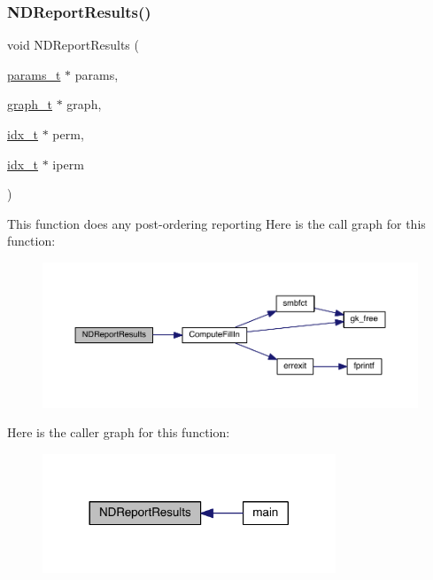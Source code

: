 \subsubsection{\texorpdfstring{N\+D\+Report\+Results()}{NDReportResults()}}
{\footnotesize\ttfamily void N\+D\+Report\+Results (\begin{DoxyParamCaption}\item[{\hyperlink{a00706}{params\+\_\+t} $\ast$}]{params,  }\item[{\hyperlink{a00734}{graph\+\_\+t} $\ast$}]{graph,  }\item[{\hyperlink{a00876_aaa5262be3e700770163401acb0150f52}{idx\+\_\+t} $\ast$}]{perm,  }\item[{\hyperlink{a00876_aaa5262be3e700770163401acb0150f52}{idx\+\_\+t} $\ast$}]{iperm }\end{DoxyParamCaption})}

This function does any post-\/ordering reporting Here is the call graph for this function\+:\nopagebreak
\begin{figure}[H]
\begin{center}
\leavevmode
\includegraphics[width=350pt]{a00948_ae474b9ac69c59e61afcdd45e4c2913f0_cgraph}
\end{center}
\end{figure}
Here is the caller graph for this function\+:\nopagebreak
\begin{figure}[H]
\begin{center}
\leavevmode
\includegraphics[width=248pt]{a00948_ae474b9ac69c59e61afcdd45e4c2913f0_icgraph}
\end{center}
\end{figure}
\mbox{\label{a00948_a0e7ce196a2f8882777957bf898739f6f}} 
